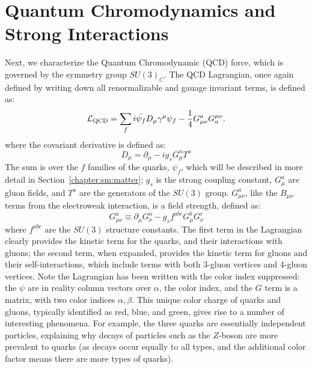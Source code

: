 \section{Quantum Chromodynamics and Strong Interactions}

Next, we characterize the Quantum Chromodynamic (QCD) force, which is governed by the symmetry group $SU(3)_C$. The QCD Lagrangian, once again defined by writing down all renormalizable and gauage invariant terms, is defined as:
%
\begin{equation}
\mathcal{L}_{\mathrm{QCD}} = \sum_f i \bar{\psi_f} D_\mu \gamma^\mu \psi_f - \frac{1}{4} G_{\mu\nu}^a G_{a}^{\mu\nu}.
\end{equation}
%
where the covariant derivative is defined as:
%
\begin{equation}
D_\mu = \partial_\mu - i g_s G_\mu^a T^a
\end{equation}
%
The sum is over the $f$ families of the quarks, $\psi_f$, which will be described in more detail in Section~\ref{chapter:sm:matter}; $g_s$ is the strong coupling constant, $G_\mu^a$ are gluon fields, and $T^a$ are the generators of the $SU(3)$ group. $G_{\mu\nu}^a$, like the $B_{\mu\nu}$ terms from the electroweak interaction, is a field strength, defined as:
%
\begin{equation}
G_{\mu\nu}^a \equiv \partial_\mu G_\nu^a - g_s f^{abc}G_\mu^b G_\nu^c
\end{equation}
%
where $f^{abc}$ are the $SU(3)$ structure constants. The first term in the Lagrangian clearly provides the kinetic term for the quarks, and their interactions with gluons; the second term, when expanded, provides the kinetic term for gluons and their self-interactions, which include terms with both 3-gluon vertices and 4-gluon vertices. Note the Lagrangian has been written with the color index suppressed: the $\psi$ are in reality column vectors over $\alpha$, the color index, and the $G$ term is a matrix, with two color indices $\alpha, \beta$. This unique color charge of quarks and gluons, typically identified as red, blue, and green, gives rise to a number of interesting phenomena. For example, the three quarks are essentially independent particles, explaining why decays of particles such as the $Z$-boson are more prevalent to quarks (as decays occur equally to all types, and the additional color factor means there are more types of quarks).

